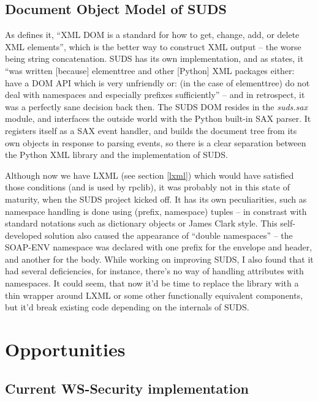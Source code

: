 \subsection{Document Object Model of SUDS}

As \cite{w3schools-domintro} defines it, ``XML DOM is a standard for how to get, change, add, or delete XML elements'', which is the better way to construct XML output -- the worse being string concatenation. SUDS has its own implementation, and as \cite{suds-doc} states, it ``was written [because] elementtree and other [Python] XML packages either: have a DOM API which is very unfriendly or: (in the case of elementtree) do not deal with namespaces and especially prefixes sufficiently'' -- and in retrospect, it was a perfectly sane decision back then. The SUDS DOM resides in the \emph{suds.sax} module, and interfaces the outside world with the Python built-in SAX parser. It registers itself as a SAX event handler, and builds the document tree from its own objects in response to parsing events, so there is a clear separation between the Python XML library and the implementation of SUDS.

Although now we have LXML (see section \ref{lxml}) which would have satisfied those conditions (and is used by rpclib), it was probably not in this state of maturity, when the SUDS project kicked off. It has its own peculiarities, such as namespace handling is done using (prefix, namespace) tuples -- in constrast with standard notations such as dictionary objects or James Clark style. This self-developed solution also caused the appearance of ``double namespaces'' -- the SOAP-ENV namespace was declared with one prefix for the envelope and header, and another for the body. While working on improving SUDS, I also found that it had several deficiencies, for instance, there's no way of handling attributes with namespaces. It could seem, that now it'd be time to replace the library with a thin wrapper around LXML or some other functionally equivalent components, but it'd break existing code depending on the internals of SUDS.

\section{Opportunities}

\subsection{Current WS-Security implementation}

